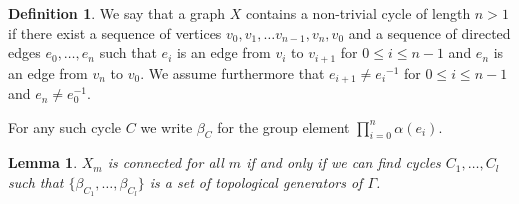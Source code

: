 \documentclass[11pt]{article}
\newtheorem{lemma}[theo]{Lemma}
\theoremstyle{definition}
\newtheorem{defi}[theo]{Definition}
\numberwithin{equation}{section}
\begin{document}
\begin{defi}
	We say that a graph $X$ contains a non-trivial cycle of length $n>1$ if there exist a sequence of vertices $v_0,v_1,\dots v_{n-1},v_n,v_0$ and a sequence of directed edges $e_0,\ldots, e_{n}$ such that $e_i$ is an edge from $v_i$ to $v_{i+1}$ for $0\le i\le n-1$ and $e_n$ is an edge from $v_n$ to $v_0$. We assume furthermore that $e_{i+1}\neq {e_i}^{-1} $ for ${0\le i\le n-1}$ and $e_n\neq e_0^{-1}$.
	
	For any such cycle $C$ we write $\beta_C$ for the group element $\prod_{i=0}^n\alpha(e_i)$.
\end{defi}
\begin{lemma} \label{lemma:connected} 
	$X_m$ is connected for all $m$ if and only if we can find cycles $C_1,\dots , C_l$ such that $\{\beta_{C_1},\dots,\beta_{C_l} \}$ is a set of topological generators of $\Gamma$. 
\end{lemma}
\end{document}
